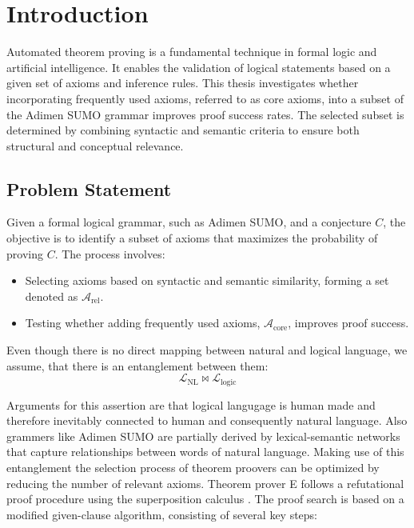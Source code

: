 \documentclass[english,version-2020-11]{uzl-thesis}
\begin{document}
%
%

\chapter{Introduction}
\label{chapter-introduction}

Automated theorem proving is a fundamental technique in formal logic and artificial intelligence. 
It enables the validation of logical statements based on a given set of axioms and inference rules. 
This thesis investigates whether incorporating frequently used axioms, referred to as core axioms, into a subset of the Adimen SUMO grammar improves proof success rates. 
The selected subset is determined by combining syntactic and semantic criteria to ensure both structural and conceptual relevance.

\section{Problem Statement}
Given a formal logical grammar, such as Adimen SUMO, and a conjecture \( C \), the objective is to identify a subset of axioms that maximizes the probability of proving \( C \). The process involves:
\begin{itemize}
    \item Selecting axioms based on syntactic and semantic similarity, forming a set denoted as \( \mathcal{A}_{\text{rel}} \).
    \item Testing whether adding frequently used axioms, \( \mathcal{A}_{\text{core}} \), improves proof success.
\end{itemize}

Even though there is no direct mapping between natural and logical language, we assume, that there is an entanglement between them: \\
\begin{equation}
    \mathcal{L}_{\text{NL}} \bowtie \mathcal{L}_{\text{logic}}
\end{equation}

Arguments for this assertion are that logical langugage is human made and therefore inevitably connected to human and consequently natural language.
Also grammers like Adimen SUMO are partially derived by lexical-semantic networks that capture relationships between words of natural language.
Making use of this entanglement the selection process of theorem proovers can be optimized by reducing the number of relevant axioms.
Theorem prover E follows a refutational proof procedure using the superposition calculus \cite{Schulz2019}. The proof search is based on a modified given-clause algorithm, consisting of several key steps:
\end{document}
